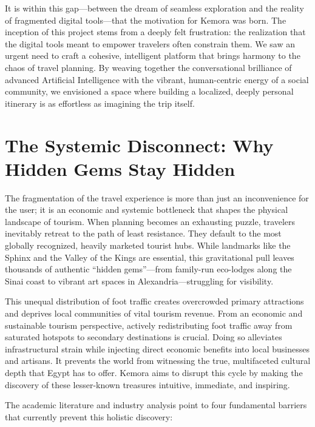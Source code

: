 It is within this gap---between the dream of seamless exploration and the reality of fragmented digital tools---that the motivation for Kemora was born. The inception of this project stems from a deeply felt frustration: the realization that the digital tools meant to empower travelers often constrain them. We saw an urgent need to craft a cohesive, intelligent platform that brings harmony to the chaos of travel planning. By weaving together the conversational brilliance of advanced Artificial Intelligence with the vibrant, human-centric energy of a social community, we envisioned a space where building a localized, deeply personal itinerary is as effortless as imagining the trip itself.

\section{The Systemic Disconnect: Why Hidden Gems Stay Hidden}
The fragmentation of the travel experience is more than just an inconvenience for the user; it is an economic and systemic bottleneck that shapes the physical landscape of tourism. When planning becomes an exhausting puzzle, travelers inevitably retreat to the path of least resistance. They default to the most globally recognized, heavily marketed tourist hubs. While landmarks like the Sphinx and the Valley of the Kings are essential, this gravitational pull leaves thousands of authentic ``hidden gems''---from family-run eco-lodges along the Sinai coast to vibrant art spaces in Alexandria---struggling for visibility. 

This unequal distribution of foot traffic creates overcrowded primary attractions and deprives local communities of vital tourism revenue. From an economic and sustainable tourism perspective, actively redistributing foot traffic away from saturated hotspots to secondary destinations is crucial. Doing so alleviates infrastructural strain while injecting direct economic benefits into local businesses and artisans. It prevents the world from witnessing the true, multifaceted cultural depth that Egypt has to offer. Kemora aims to disrupt this cycle by making the discovery of these lesser-known treasures intuitive, immediate, and inspiring. 

The academic literature and industry analysis point to four fundamental barriers that currently prevent this holistic discovery:

